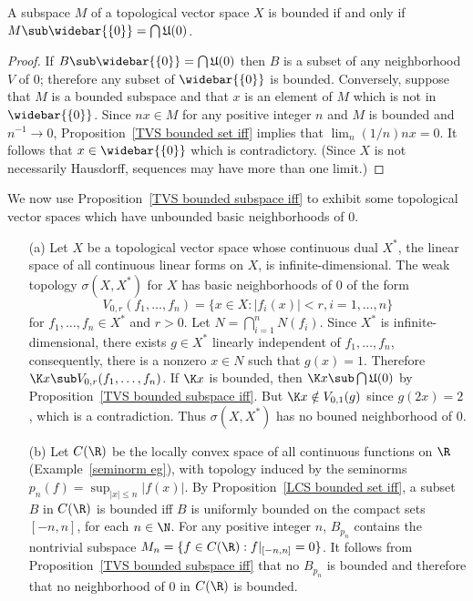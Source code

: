 \begin{proposition}\label{TVS bounded subspace iff}
A subspace $M$ of a topological vector space $X$ is bounded if and only if $M\sub\widebar{\{0\}}=\bigcap\mathfrak{U}(0)$.
\end{proposition}
\begin{proof}
If $B\sub\widebar{\{0\}}=\bigcap\mathfrak{U}(0)$ then $B$ is a subset of any neighborhood $V$ of $0$; therefore any subset of $\widebar{\{0\}}$ is bounded. Conversely, suppose that $M$ is a bounded subspace and that $x$ is an element of $M$ which is not in $\widebar{\{0\}}$. Since $nx\in M$ for any positive integer $n$ and $M$ is bounded and $n^{-1}\to 0$, Proposition~\ref{TVS bounded set iff} implies that $\lim_n(1/n)nx=0$. It follows that $x\in\widebar{\{0\}}$ which is contradictory. (Since $X$ is not necessarily Hausdorff, sequences may have more than one limit.)
\end{proof}
We now use Proposition~\ref{TVS bounded subspace iff} to exhibit some topological vector spaces which have unbounded basic neighborhoods of $0$.
\begin{example}\label{TVS no bounded nbhd eg}
\mbox{}
\begin{itemize}
\item[(a)] Let $X$ be a topological vector space whose continuous dual $X^*$, the linear space of all continuous linear forms on $X$, is infinite-dimensional. The weak topology $\sigma(X,X^*)$ for $X$ has basic neighborhoods of $0$ of the form
\[V_{0,r}(f_1,\dots,f_n)=\{x\in X:|f_i(x)|<r,i=1,\dots,n\}\]
for $f_1,\dots,f_n\in X^*$ and $r>0$. Let $N=\bigcap_{i=1}^{n}N(f_i)$. Since $X^*$ is infinite-dimensional, there exists $g\in X^*$ linearly independent of $f_1,\dots,f_n$, consequently, there is a nonzero $x\in N$ such that $g(x)=1$. Therefore $\K x\sub V_{0,r}(f_1,\dots,f_n)$. If $\K x$ is bounded, then $\K x\sub\bigcap\mathfrak{U}(0)$ by Proposition~\ref{TVS bounded subspace iff}. But $\K x\notin V_{0,1}(g)$ since $g(2x)=2$, which is a contradiction. Thus $\sigma(X,X^*)$ has no bouned neighborhood of $0$.
\item[(b)] Let $C(\R)$ be the locally convex space of all continuous functions on $\R$ (Example~\ref{seminorm eg}), with topology induced by the seminorms $p_n(f)=\sup_{|x|\leq n}|f(x)|$. By Proposition~\ref{LCS bounded set iff}, a subset $B$ in $C(\R)$ is bounded iff $B$ is uniformly bounded on the compact sets $[-n,n]$, for each $n\in\N$. For any positive integer $n$, $B_{p_n}$ contains the nontrivial subspace $M_n=\{f\in C(\R):f|_{[-n,n]}=0\}$. It follows from Proposition~\ref{TVS bounded subspace iff} that no $B_{p_n}$ is bounded and therefore that no neighborhood of $0$ in $C(\R)$ is bounded.
\end{itemize}
\end{example}
